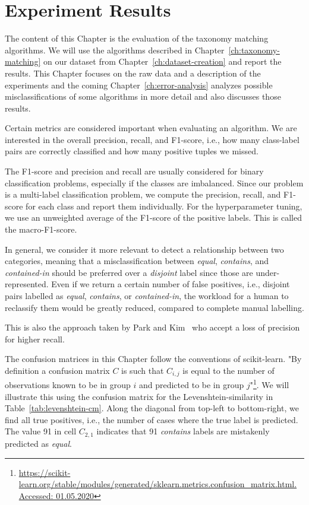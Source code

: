 \chapter{Experiment Results}
\label{ch:experiment-results}

The content of this Chapter is the evaluation of the taxonomy matching algorithms.
We will use the algorithms described in Chapter~\ref{ch:taxonomy-matching} on our dataset
from Chapter~\ref{ch:dataset-creation} and report the results.
This Chapter focuses on the raw data and a description of the experiments and the coming
Chapter~\ref{ch:error-analysis} analyzes possible misclassifications of some algorithms in more detail
and also discusses those results.

Certain metrics are considered important when evaluating an algorithm.
We are interested in the overall precision, recall, and F1-score, i.e., how many class-label pairs are correctly classified
and how many positive tuples we missed.

The F1-score and precision and recall are usually considered for binary classification problems,
especially if the classes are imbalanced.
Since our problem is a multi-label classification problem, we compute the precision, recall, and F1-score for
each class and report them individually.
For the hyperparameter tuning, we use an unweighted average of the F1-score of the positive labels.
This is called the macro-F1-score.

In general, we consider it more relevant to detect a relationship between two categories, meaning that
a misclassification between \emph{equal}, \emph{contains}, and \emph{contained-in} should be preferred over a \emph{disjoint}
label since those are under-represented.
Even if we return a certain number of false positives, i.e., disjoint pairs labelled as \emph{equal}, \emph{contains},
or \emph{contained-in}, the workload for a human to reclassify them would be greatly reduced, compared to complete
manual labelling.

This is also the approach taken by Park and Kim~\cite{park2007ontology} who accept a loss of precision for
higher recall.

The confusion matrices in this Chapter follow the conventions of scikit-learn.
"By definition a confusion matrix $C$ is such that $C_{i,j}$ is equal to  the number of observations
known to be in group $i$ and predicted to be in group $j$"\footnote{\url{https://scikit-learn.org/stable/modules/generated/sklearn.metrics.confusion_matrix.html.
Accessed: 01.05.2020}}.
We will illustrate this using the confusion matrix for the Levenshtein-similarity in Table~\ref{tab:levenshtein-cm}.
Along the diagonal from top-left to bottom-right, we find all true positives, i.e., the number of cases where the true
label is predicted.
The value 91 in cell $C_{2,1}$ indicates that 91 \emph{contains} labels are mistakenly predicted as \emph{equal}.

